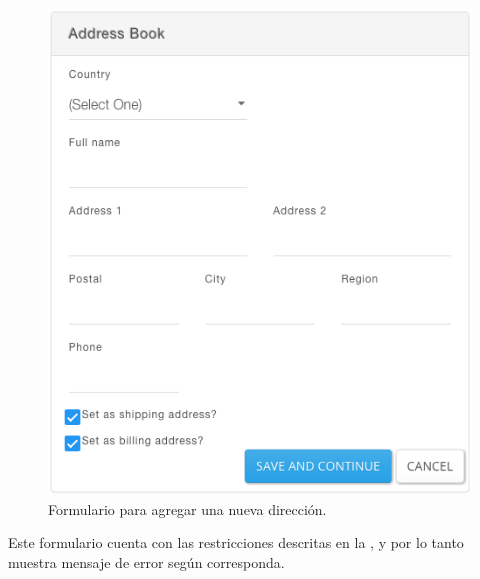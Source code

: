 		\begin{figure}[h!]
			\centering
			\includegraphics[width=1\textwidth]{figuras/address/form/add_new_address.png}
			\caption{Formulario para agregar una nueva dirección.}
			\label{figure:address:form:add_new_address}
		\end{figure}

		Este formulario cuenta con las restricciones descritas en la , y por lo tanto muestra mensaje de error según corresponda.

